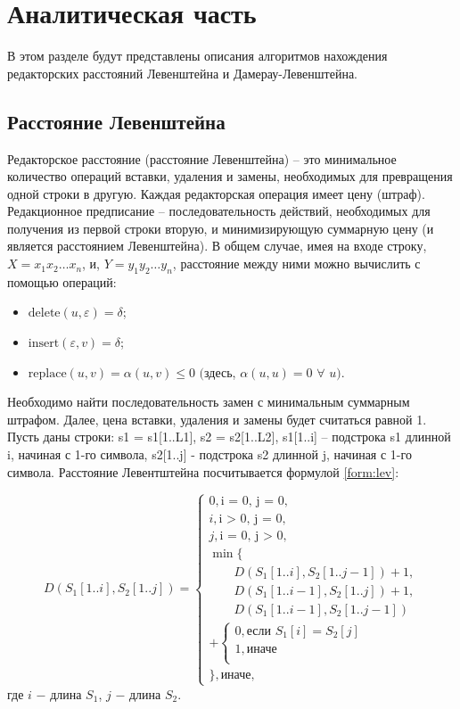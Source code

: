 \chapter{Аналитическая часть}

В этом разделе будут представлены описания алгоритмов нахождения редакторских расстояний Левенштейна и Дамерау-Левенштейна.

\section{Расстояние Левенштейна}

Редакторское расстояние (расстояние Левенштейна) -- это минимальное количество операций вставки, удаления и замены, необходимых для превращения одной строки в другую.
Каждая редакторская операция имеет цену (штраф).
Редакционное предписание -- последовательность действий, необходимых для получения из первой строки вторую, и минимизирующую суммарную цену (и является расстоянием Левенштейна).
В общем случае, имея на входе строку, $X = x_1x_2 \dots x_n$, и, $Y = y_1y_2 \dots y_n$, расстояние между ними можно вычислить с помощью операций:

\begin{itemize}
	\item $\text{delete}(u, \varepsilon) = \delta$;
    \item $\text{insert}(\varepsilon, v) = \delta$;
    \item $\text{replace}(u, v) = \alpha(u, v) \leq 0$  $($здесь, $\alpha(u, u) = 0$ $\forall$ $u).$
\end{itemize}

Необходимо найти последовательность замен с минимальным суммарным штрафом.
Далее, цена вставки, удаления и замены будет считаться равной 1.
Пусть даны строки: s1 = s1[1..L1], s2 = s2[1..L2], s1[1..i] -- подстрока s1 длинной i, начиная с 1-го символа, s2[1..j] - подстрока s2 длинной j, начиная с 1-го символа.
Расстояние Левентштейна посчитывается формулой \ref{form:lev}:

\begin{equation}
	\label{form:lev}
	D(S_1[1..i], S_2[1..j]) = 
	\begin{cases}
	  0, \text{i = 0, j = 0},\\
	  i, \text{i > 0, j = 0},\\
	  j, \text{i = 0, j > 0},\\
	  \min \lbrace \\
		\qquad D(S_1[1..i], S_2[1..j - 1]) + 1,\\
		\qquad D(S_1[1..i - 1], S_2[1..j]) + 1,\\
		\qquad D(S_1[1..i - 1], S_2[1..j - 1])\\ + \begin{cases}
		  0, \text{если }S_1[i] = S_2[j]\\
		  1, \text{иначе}\\
		\end{cases}\\
	  \rbrace, \text{иначе,}
	\end{cases}
\end{equation}
где $i$ $-$ длина $S_1$, $j$ $-$ длина $S_2$.

